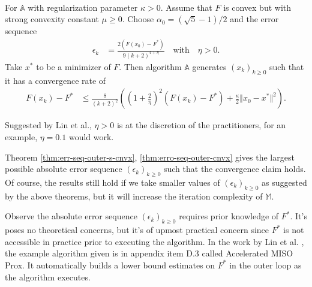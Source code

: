 \documentclass[12pt]{article}
\begin{document}
            \begin{theorem}\label{thm:erro-seq-outer-cnvx}\;\\
                For $\mathbb A$ with regularization parameter $\kappa > 0$. 
                Assume that $F$ is convex but with strong convexity constant $\mu \ge 0$. 
                Choose $\alpha_0 = \left(\sqrt{5} - 1\right)/2$ and the error sequence 
                \begin{align*}
                    \epsilon_k &= \frac{2(F(x_0) - F^*)}{9(k + 2)^{4 + \eta}} \quad 
                    \text{with}\quad \eta > 0. 
                \end{align*}
                Take $x^*$ to be a minimizer of $F$. 
                Then algorithm $\mathbb A$ generates $(x_k)_{k \ge0}$ such that it has a convergence rate of 
                \begin{align*}
                    F(x_k) - F^* &\le 
                    \frac{8}{(k + 2)^2}\left(
                        \left(1 + \frac{2}{\eta}\right)^2(F(x_k) - F^*)
                        + \frac{\kappa}{2}\Vert x_0 - x^*\Vert^2
                    \right).
                \end{align*}
            \end{theorem}
            \begin{remark}
                Suggested by Lin et al., $\eta > 0$ is at the discretion of the practitioners, for an example, $\eta = 0.1$ would work. 
            \end{remark}
            Theorem \ref{thm:err-seq-outer-s-cnvx}, \ref{thm:erro-seq-outer-cnvx} gives the largest possible absolute error sequence $(\epsilon_k)_{k \ge 0}$ such that the convergence claim holds. 
            Of course, the results still hold if we take smaller values of $(\epsilon_k)_{k \ge0}$ as suggested by the above theorems, but it will increase the iteration complexity of $\mathbb M$. 
            \par
            Observe the absolute error sequence $(\epsilon_k)_{k \ge 0}$ requires prior knowledge of $F^*$. 
            It's poses no theoretical concerns, but it's of upmost practical concern since $F^*$ is not accessible in practice prior to executing the algorithm. 
            In the work by Lin et al. \cite{lin_universal_2015}, the example algorithm given is in appendix item D.3 called Accelerated MISO Prox.
            It automatically builds a lower bound estimates on $F^*$ in the outer loop as the algorithm executes.
\end{document}
